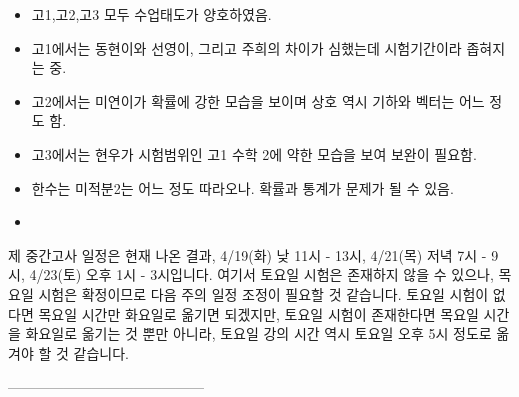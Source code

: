 \documentclass[idxtotoc,hyperref,openany]{labbook} %
\begin{document}

\begin{itemize}
	\item 고1,고2,고3 모두 수업태도가 양호하였음.
	\item 고1에서는 동현이와 선영이, 그리고 주희의 차이가 심했는데 시험기간이라 좁혀지는 중.
	\item 고2에서는 미연이가 확률에 강한 모습을 보이며 상호 역시 기하와 벡터는 어느 정도 함.
	\item 고3에서는 현우가 시험범위인 고1 수학 2에 약한 모습을 보여 보완이 필요함.
	\item 한수는 미적분2는 어느 정도 따라오나. 확률과 통계가 문제가 될 수 있음.
	\item 
\end{itemize}



제 중간고사 일정은 현재 나온 결과, 4/19(화) 낮 11시 - 13시, 4/21(목) 저녁 7시 - 9시, 4/23(토) 오후 1시 - 3시입니다. 여기서 토요일 시험은 존재하지 않을 수 있으나, 목요일 시험은 확정이므로 다음 주의 일정 조정이 필요할 것 같습니다. 토요일 시험이 없다면 목요일 시간만 화요일로 옮기면 되겠지만, 토요일 시험이 존재한다면 목요일 시간을 화요일로 옮기는 것 뿐만 아니라, 토요일 강의 시간 역시 토요일 오후 5시 정도로 옮겨야 할 것 같습니다.





------------------------------------------










\end{document}
